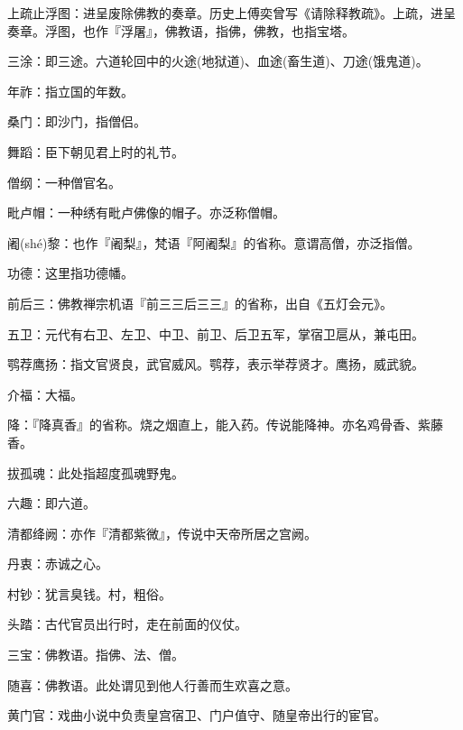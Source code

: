 \startbuffer[475]
上疏止浮图：进呈废除佛教的奏章。历史上傅奕曾写《请除释教疏》。上疏，进呈奏章。浮图，也作『浮屠』，佛教语，指佛，佛教，也指宝塔。
\stopbuffer


\startbuffer[476]
三涂：即三途。六道轮回中的火途(地狱道)、血途(畜生道)、刀途(饿鬼道)。
\stopbuffer


\startbuffer[477]
年祚：指立国的年数。
\stopbuffer


\startbuffer[478]
桑门：即沙门，指僧侣。
\stopbuffer


\startbuffer[479]
舞蹈：臣下朝见君上时的礼节。
\stopbuffer


\startbuffer[480]
僧纲：一种僧官名。
\stopbuffer


\startbuffer[481]
毗卢帽：一种绣有毗卢佛像的帽子。亦泛称僧帽。
\stopbuffer


\startbuffer[482]
阇(shé)黎：也作『阇梨』，梵语『阿阇梨』的省称。意谓高僧，亦泛指僧。
\stopbuffer


\startbuffer[483]
功德：这里指功德幡。
\stopbuffer


\startbuffer[484]
前后三：佛教禅宗机语『前三三后三三』的省称，出自《五灯会元》。
\stopbuffer


\startbuffer[485]
五卫：元代有右卫、左卫、中卫、前卫、后卫五军，掌宿卫扈从，兼屯田。
\stopbuffer


\startbuffer[486]
鹗荐鹰扬：指文官贤良，武官威风。鹗荐，表示举荐贤才。鹰扬，威武貌。
\stopbuffer


\startbuffer[487]
介福：大福。
\stopbuffer


\startbuffer[488]
降：『降真香』的省称。烧之烟直上，能入药。传说能降神。亦名鸡骨香、紫藤香。
\stopbuffer


\startbuffer[489]
拔孤魂：此处指超度孤魂野鬼。
\stopbuffer


\startbuffer[490]
六趣：即六道。
\stopbuffer


\startbuffer[491]
清都绛阙：亦作『清都紫微』，传说中天帝所居之宫阙。
\stopbuffer


\startbuffer[492]
丹衷：赤诚之心。
\stopbuffer


\startbuffer[493]
村钞：犹言臭钱。村，粗俗。
\stopbuffer


\startbuffer[494]
头踏：古代官员出行时，走在前面的仪仗。
\stopbuffer


\startbuffer[495]
三宝：佛教语。指佛、法、僧。
\stopbuffer


\startbuffer[496]
随喜：佛教语。此处谓见到他人行善而生欢喜之意。
\stopbuffer


\startbuffer[497]
黄门官：戏曲小说中负责皇宫宿卫、门户值守、随皇帝出行的宦官。
\stopbuffer


